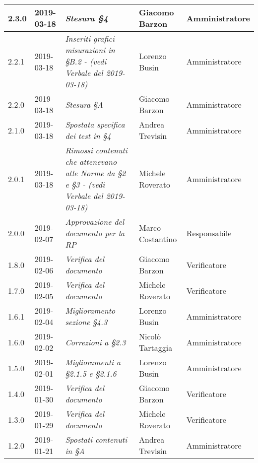 \begin{longtable}{C{2cm}|C{2.5cm}|C{4.5cm}|C{2.5cm}|C{3cm}}
		2.3.0 & 2019-03-18 & \emph{Stesura §4} & Giacomo Barzon & Amministratore \\
		\hline
	
		2.2.1 & 2019-03-18 & \emph{Inseriti grafici misurazioni in §B.2 - (vedi Verbale del 2019-03-18)} & Lorenzo Busin & Amministratore \\
		\hline
		
		2.2.0 & 2019-03-18 & \emph{Stesura §A} & Giacomo Barzon & Amministratore \\
		\hline
	
		2.1.0 & 2019-03-18 & \emph{Spostata specifica dei test in §4} & Andrea Trevisin  & Amministratore \\
		\hline
	
		2.0.1 & 2019-03-18 & \emph{Rimossi contenuti che attenevano alle Norme da §2 e §3 - (vedi Verbale del 2019-03-18)} & Michele Roverato & Amministratore \\
		\hline
	
		2.0.0 & 2019-02-07 & \emph{Approvazione del documento per la RP} & Marco Costantino & Responsabile \\
		\hline
	
		1.8.0 & 2019-02-06 & \emph{Verifica del documento} & Giacomo Barzon & Verificatore \\
		\hline
		
		1.7.0 & 2019-02-05 & \emph{Verifica del documento} & Michele Roverato & Verificatore \\
		\hline
	
		1.6.1 & 2019-02-04 & \emph{Miglioramento sezione §4.3} & Lorenzo Busin & Amministratore \\
		\hline
		
		1.6.0 & 2019-02-02 & \emph{Correzioni a §2.3} & Nicolò Tartaggia & Amministratore \\
		\hline
	
		1.5.0 & 2019-02-01 & \emph{Miglioramenti a  §2.1.5 e §2.1.6} & Lorenzo Busin & Amministratore \\
		\hline
	
		1.4.0 & 2019-01-30 & \emph{Verifica del documento} & Giacomo Barzon & Verificatore \\
		\hline
		
		1.3.0 & 2019-01-29 & \emph{Verifica del documento} & Michele Roverato & Verificatore \\
		\hline
		
		1.2.0 & 2019-01-21 & \emph{Spostati contenuti in §A} & Andrea Trevisin & Amministratore \\
		\hline
	

\end{longtable}
